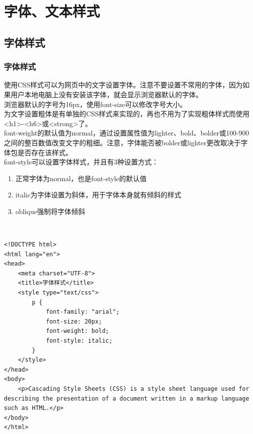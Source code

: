 \newpage

\chapter{字体、文本样式}

\section{字体样式}

\subsection{字体样式}

使用CSS样式可以为网页中的文字设置字体。注意不要设置不常用的字体，因为如果用户本地电脑上没有安装该字体，就会显示浏览器默认的字体。\\

浏览器默认的字号为16px，使用font-size可以修改字号大小。\\

为文字设置粗体是有单独的CSS样式来实现的，再也不用为了实现粗体样式而使用<h1>-<h6>或<strong>了。\\

font-weight的默认值为normal，通过设置属性值为lighter、bold、bolder或100-900之间的整百数值改变文字的粗细。注意，字体能否被bolder或lighter更改取决于字体包是否存在该样式。\\

font-style可以设置字体样式，并且有3种设置方式：

\begin{enumerate}
	\item 正常字体为normal，也是font-style的默认值
	\item italic为字体设置为斜体，用于字体本身就有倾斜的样式
	\item oblique强制将字体倾斜
\end{enumerate}

\\

\begin{lstlisting}[style=htmlcssjs]
<!DOCTYPE html>
<html lang="en">
<head>
    <meta charset="UTF-8">
    <title>字体样式</title>
    <style type="text/css">
        p {
            font-family: "arial";
            font-size: 20px;
            font-weight: bold;
            font-style: italic;
        }   
    </style>
</head>
<body>
    <p>Cascading Style Sheets (CSS) is a style sheet language used for describing the presentation of a document written in a markup language such as HTML.</p>
</body>
</html>
\end{lstlisting}


